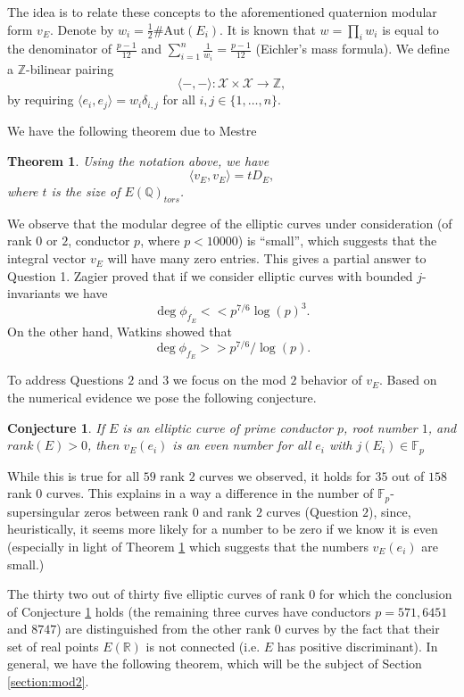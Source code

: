 \documentclass[13pt]{amsart}
\newtheorem{theorem}{Theorem}
\newtheorem{conjecture}{Conjecture}
\theoremstyle{remark}
\numberwithin{theorem}{section} \numberwithin{equation}{section}
\begin{document}
The idea is to relate these concepts to the aforementioned quaternion modular 
form $v_E$.
Denote by $w_i=\frac{1}{2}\#\textrm{Aut}(E_i)$. It is known that $w=\prod_i w_i$ 
is equal to the denominator of $\frac{p-1}{12}$ and $\sum_{i=1}^n 
\frac{1}{w_i}=\frac{p-1}{12}$ (Eichler's mass formula). 
 We define a ${\mathbb{Z}}$-bilinear pairing 
\[
\langle -,- \rangle:{\mathcal{X}}\times{\mathcal{X}} \rightarrow {\mathbb{Z}},
\]
by requiring $\langle e_i,e_j \rangle=w_i \delta_{i,j}$ for all $i,j \in \{1,\ldots,n \}$.

We have the following theorem due to Mestre  \cite[Theorem ~3]{Mestre}
\begin{theorem} \label{prop:modular} Using the notation above, we have
$$\langle v_E,v_E \rangle=t D_E,$$
where $t$ is the size of $E({\mathbb{Q}})_{tors}$.
\end{theorem}

We observe that the modular degree of the elliptic curves under consideration 
(of rank $0$ or $2$, conductor $p$, where $p<10000$) is ``small'', which 
suggests that the integral vector $v_E$ will have many zero entries. This gives 
a partial answer to Question 1. Zagier \cite[Theorem ~5]{Zagier} proved that if we consider
elliptic curves with bounded $j$-invariants we have 
\[\deg \phi_{f_E}<<p^{7/6}\log(p)^3. \]
 On the other 
hand, Watkins \cite[Theorem ~5.1]{Wat} showed that 
\[\deg \phi_{f_E} >> p^{7/6}/\log(p). \]

To address Questions $2$ and $3$ we focus on the mod $2$ behavior of $v_E$. Based on the numerical evidence we pose the following conjecture.

\begin{conjecture}\label{conj:1} If $E$ is an elliptic curve of prime conductor 
$p$, root number $1$, and $rank(E)>0$, then $v_E(e_i)$ is an even number for 
all $e_i$  with $j(E_i)\in {\mathbb{F}_p}$ 
\end{conjecture}

While this is true for all $59$ rank $2$ curves we observed, it holds for $35$
out of $158$ rank $0$ curves. This explains in a way a difference in the number 
of ${\mathbb{F}_p}$-supersingular zeros between rank $0$ and rank $2$ curves (Question $2$), 
since, heuristically, it seems more likely for a number to be zero if we know 
it is even (especially in light of Theorem \ref{prop:modular} which suggests 
that the numbers $v_E(e_i)$ are small.)

The thirty two out of thirty five elliptic curves of rank $0$ for which the 
conclusion of Conjecture \ref{conj:1} holds (the remaining three curves have 
conductors $p=571, 6451$ and  $8747$) are distinguished from the other rank $0$ 
curves by the fact that their set of real points $E(\mathbb{R})$ is not 
connected (i.e. $E$ has positive discriminant). In general, we have the 
following theorem, which will be the subject of Section \ref{section:mod2}.
\end{document}

